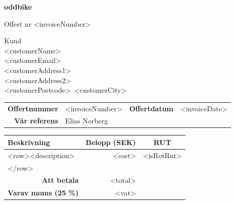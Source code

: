 \documentclass[a4paper,11pt]{extarticle}
\newcommand{\changefont}{%
        \fontsize{9}{11}\selectfont
    }
\begin{document}
\pagestyle{fancy}
\fancyhf{} %
\renewcommand{\headrulewidth}{0pt}
\renewcommand{\footrulewidth}{0pt}

\setlength{\fboxsep}{1.5em}
\setlength{\parindent}{0pt}

{\color{OliveGreen}
\fontsize{48}{0}\selectfont
\hspace{-0.6em}
\textbf{
oddbike}}

\vspace{2em}
\begin{minipage}[t]{0.45\textwidth}
{\huge
Offert nr <invoiceNumber> \\
}
    \vspace{2em}
\end{minipage}
\begin{minipage}[t]{0.3\textwidth}
{\huge Kund}\\

<customerName>\\
<customerEmail>\\
<customerAddress1>\\
<customerAddress2>\\
<customerPostcode>~<customerCity>\\
\end{minipage}

\renewcommand\arraystretch{1.5}
\begin{tabular*}{\linewidth}{rlrl}
\hline
    \textbf{Offertnummer} & <invoiceNumber> & \textbf{Offertdatum} & <invoiceDate> \\
    \textbf{Vår referens} & Elias Norberg & &\\
\hline
\end{tabular*}

\begin{tabularx}{\textwidth}{Xrc}
\rowcolor{Gray}
\changefont \textbf{Beskrivning} &
\multicolumn{1}{l}{\changefont \textbf{Belopp (SEK)}} &
\changefont \textbf{RUT}\\
\hline
    <row><description> & <cost> & <isRotRut>\\
    </row>
    & & \\
\hline
    \multicolumn{1}{r}{\textbf{Att betala}} & <total> \\
    \multicolumn{1}{r}{\textbf{Varav moms (25 \%)}} & <vat> \\
\hline
\end{tabularx}

\renewcommand\arraystretch{1}
\end{document}
